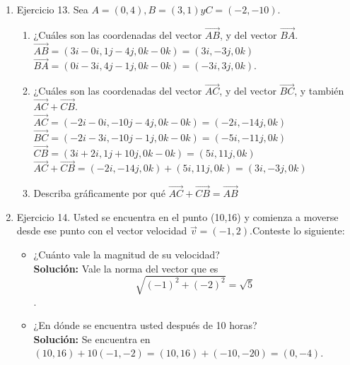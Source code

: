 \documentclass[10pt,letterpaper,fleqn]{article}
\begin{document}
\begin{enumerate}
\begin{enumerate}
          \end{enumerate}

        \item Ejercicio 13. Sea $A = (0, 4), B = (3, 1) y C = (−2, −10)$.
        \begin{enumerate}
          \item ¿Cuáles son las coordenadas del vector $\overrightarrow{AB}$, y
          del vector $\overrightarrow{BA}$. \\
          $\overrightarrow{AB} = (3i-0i,1j-4j,0k-0k) = (3i,-3j,0k)$ \\
          $\overrightarrow{BA} = (0i-3i,4j-1j,0k-0k) = (-3i,3j,0k)$.

          \item ¿Cuáles son las coordenadas del vector $\overrightarrow{AC}$, y
          del vector $\overrightarrow{BC}$, y también $\overrightarrow{AC} +
          \overrightarrow{CB}$. \\
          $\overrightarrow{AC} = (-2i-0i,-10j-4j,0k-0k) = (-2i,-14j,0k)$ \\
          $\overrightarrow{BC} = (-2i-3i,-10j-1j,0k-0k) = (-5i,-11j,0k)$ \\
          $\overrightarrow{CB} = (3i+2i,1j+10j,0k-0k) = (5i,11j,0k)$ \\
          $\overrightarrow{AC} + \overrightarrow{CB} = (-2i,-14j,0k) +
          (5i,11j,0k) = (3i,-3j,0k)$

          \item Describa gráficamente por qué $\overrightarrow{AC} +
          \overrightarrow{CB} = \overrightarrow{AB}$

        \end{enumerate}

        \item Ejercicio 14. Usted se encuentra en el punto (10,16) y comienza a moverse desde ese punto con el vector velocidad $\overrightarrow{v}=(-1,2)$.Conteste lo siguiente:
        \begin{itemize}

            \item ¿Cuánto vale la magnitud de su velocidad?\\
            \textbf{Solución:} Vale la norma del vector que es $$\sqrt{(-1)^2 + (-2)^2}=\sqrt{5}$$.

            \item ¿En dónde se encuentra usted después de 10 horas?\\
            \textbf{Solución:} Se encuentra en $(10,16)+10(-1,-2)=(10,16)+(-10,-20)=(0,-4)$.


\end{itemize}
\end{enumerate}
\end{document}
